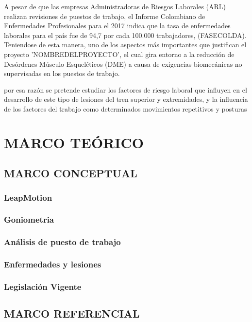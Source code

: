 A pesar de que las empresas Administradoras de Riesgos Laborales (ARL) realizan revisiones de puestos de trabajo, el Informe Colombiano de Enfermedades Profesionales para el 2017 indica que la tasa de enfermedades laborales para el país fue de 94,7 por cada 100.000 trabajadores, (FASECOLDA). Teniendose de esta manera, uno de los aspectos más importantes que justifican el proyecto 'NOMBREDELPROYECTO', el cual gira entorno a la reducción de Desórdenes Músculo Esqueléticos (DME) a causa de exigencias biomecánicas no supervisadas en los puestos de trabajo.


por esa razón se pretende estudiar los factores de riesgo laboral que influyen en el desarrollo de este tipo de lesiones del tren superior y extremidades, y la influencia de los factores del trabajo como determinados movimientos repetitivos y posturas

\chapter{MARCO TEÓRICO}
\section{MARCO CONCEPTUAL}
\subsection{LeapMotion}
\subsection{Goniometria}
\subsection{Análisis de puesto de trabajo}
\subsection{Enfermedades y lesiones}
\subsection{Legislación Vigente}
\section{MARCO REFERENCIAL}
